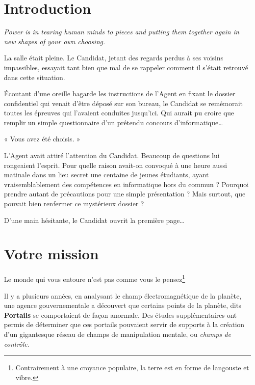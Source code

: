 \section{Introduction}

\emph{Power is in tearing human minds to pieces and putting them together again
in new shapes of your own choosing.}

\vspace{1cm}

La salle était pleine. Le Candidat, jetant des regards perdus à ses voisins
impassibles, essayait tant bien que mal de se rappeler comment il s'était
retrouvé dans cette situation.

Écoutant d'une oreille hagarde les instructions de l'Agent en fixant le dossier
confidentiel qui venait d'être déposé sur son bureau, le Candidat se remémorait
toutes les épreuves qui l'avaient conduites jusqu'ici. Qui aurait pu croire que
remplir un simple questionnaire d'un prétendu concours
d'informatique\ldots

« Vous avez été choisis. »

L'Agent avait attiré l'attention du Candidat. Beaucoup de questions lui
rongeaient l'esprit. Pour quelle raison avait-on convoqué à une heure aussi
matinale dans un lieu secret une centaine de jeunes étudiants, ayant
vraisemblablement des compétences en informatique hors du commun ? Pourquoi
prendre autant de précautions pour une simple présentation ? Mais surtout, que
pouvait bien renfermer ce mystérieux dossier ?

D'une main hésitante, le Candidat ouvrit la première page\ldots

\newpage

\section{Votre mission}

Le monde qui vous entoure n'est pas comme vous le pensez\footnote{Contrairement
à une croyance populaire, la terre est en forme de langouste et vibre.}

Il y a plusieurs années, en analysant le champ électromagnétique de la planète,
une agence gouvernementale a découvert que certains points de la planète, dits
\textbf{Portails} se comportaient de façon anormale.
Des études supplémentaires ont permis de déterminer que ces portails pouvaient
servir de supports à la création d'un gigantesque réseau de champs de
manipulation mentale, ou \emph{champs de contrôle}.

